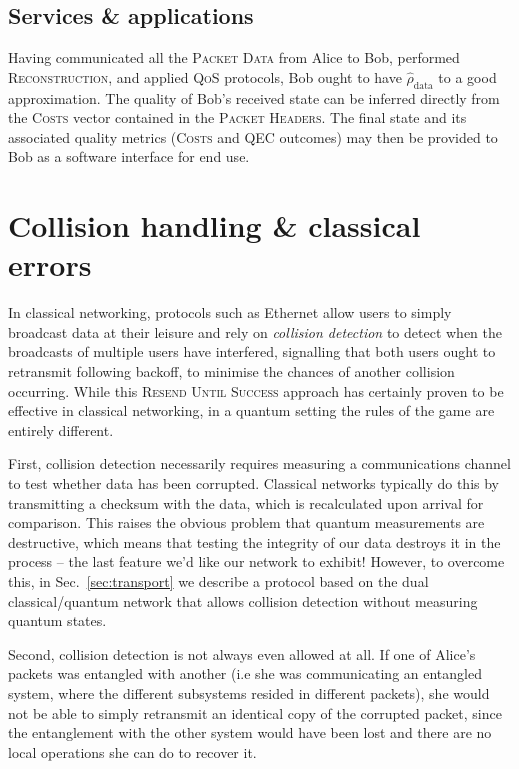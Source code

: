 \documentclass[aps,rmp,twocolumn,amsmath,amssymb,nofootinbib,superscriptaddress,longbibliography,floatfix,table-of-contents,eqsecnum]{revtex4-1}
\begin{document}
%
%

\subsection{Services \& applications} 

Having communicated all the \textsc{Packet Data} from Alice to Bob, performed \textsc{Reconstruction}, and applied \textsc{QoS} protocols, Bob ought to have $\hat\rho_\text{data}$ to a good approximation. The quality of Bob's received state can be inferred directly from the \textsc{Costs} vector contained in the \textsc{Packet Headers}. The final state and its associated quality metrics (\textsc{Costs} and QEC outcomes) may then be provided to Bob as a software interface for end use.

%
%

\section{Collision handling \& classical errors} \label{sec:collision}  

In classical networking, protocols such as Ethernet allow users to simply broadcast data at their leisure and rely on \textit{collision detection} to detect when the broadcasts of multiple users have interfered, signalling that both users ought to retransmit following backoff, to minimise the chances of another collision occurring. While this \textsc{Resend Until Success} approach has certainly proven to be effective in classical networking, in a quantum setting the rules of the game are entirely different.

First, collision detection necessarily requires measuring a communications channel to test whether data has been corrupted. Classical networks typically do this by transmitting a checksum with the data, which is recalculated upon arrival for comparison. This raises the obvious problem that quantum measurements are destructive, which means that testing the integrity of our data destroys it in the process -- the last feature we'd like our network to exhibit! However, to overcome this, in Sec.~\ref{sec:transport} we describe a protocol based on the dual classical/quantum network that allows collision detection without measuring quantum states.

Second, collision detection is not always even allowed at all. If one of Alice's packets was entangled with another (i.e she was communicating an entangled system, where the different subsystems resided in different packets), she would not be able to simply retransmit an identical copy of the corrupted packet, since the entanglement with the other system would have been lost and there are no local operations she can do to recover it.
\end{document}
